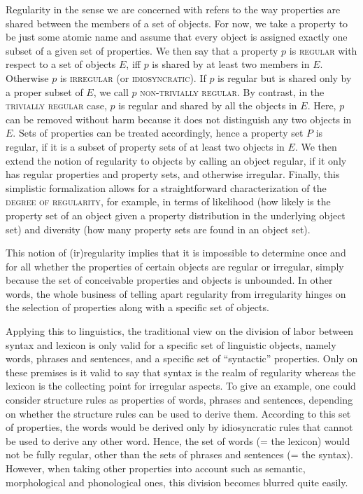 \documentclass[output=paper]{langsci/langscibook}
\begin{document}
Regularity in the sense we are concerned with refers to the way properties are shared between the members of a set of objects. For now, we take a property to be just some atomic name and assume that every object is assigned exactly one subset of a given set of properties. We then say that a property $p$  is \textsc{regular} with respect to a set of objects $E$, iff $p$ is shared by at least two members in $E$. Otherwise $p$ is \textsc{irregular} (or \textsc{idiosyncratic}). If $p$ is regular but is shared only by a proper subset of $E$, we call $p$ \textsc{non-trivially regular}. By contrast, in the \textsc{trivially regular} case, $p$ is regular and shared by all the objects in $E$. Here, $p$ can be removed without harm because it does not distinguish any two objects in $E$. Sets of properties can be treated accordingly, hence a property set $P$ is regular, if it is a subset of property sets of at least two objects in $E$. We then extend the notion of regularity to objects by calling an object regular, if it only has regular properties and property sets, and otherwise irregular. Finally, this simplistic formalization allows for a straightforward characterization of the \textsc{degree of regularity}, for example, in terms of likelihood (how likely is the property set of an object given a property distribution in the underlying object set) and diversity (how many property sets are found in an object set).

This notion of (ir)regularity implies that it is impossible to determine once and for all whether the properties of certain objects are regular or irregular, simply because the set of conceivable properties and objects is unbounded. In other words, the whole business of telling apart regularity from irregularity hinges on the selection of properties along with a specific set of objects. 

Applying this to linguistics, the traditional view on the division of labor between syntax and lexicon is only valid for a specific set of linguistic objects, namely words, phrases and sentences, and a specific set of ``syntactic'' properties. Only on these premises is it valid to say that syntax is the realm of regularity whereas the lexicon is the collecting point for  irregular aspects. To give an example, one could consider  structure rules as properties of words, phrases and sentences, depending on whether the  structure rules can be used to derive them. According to this set of properties, the words would be derived only by idiosyncratic rules that cannot be used to derive any other word. Hence, the set of words (= the lexicon) would not be fully regular, other than the sets of phrases and sentences (= the syntax). However, when taking other properties into account such as semantic, morphological and phonological ones, this division becomes blurred quite easily.
\end{document}

